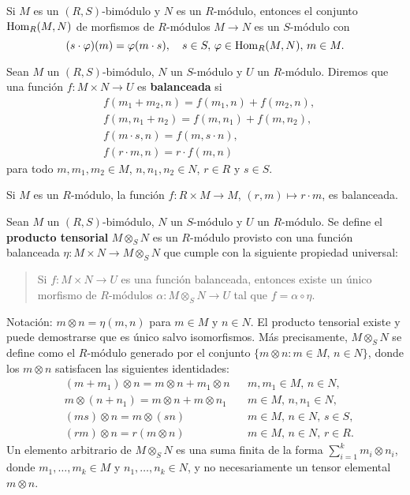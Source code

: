 \begin{example}
Si $M$ es un $(R,S)$-bimódulo y $N$ es un $R$-módulo, entonces el conjunto 
$\operatorname{Hom}_R(M,N)$ de morfismos de $R$-módulos $M\to N$ es un 
$S$-módulo con 
\[
(s\cdot \varphi)(m)=\varphi(m\cdot s),\quad s\in S,\,\varphi\in\operatorname{Hom}_R(M,N),\,m\in M.
\]
\end{example}

Sean $M$ un $(R,S)$-bimódulo, $N$ un $S$-módulo y $U$ un $R$-módulo. 
Diremos que una función $f\colon M\times N\to U$ 
es \textbf{balanceada} si 
\begin{align*}
    &f(m_1+m_2,n)=f(m_1,n)+f(m_2,n),\\
    &f(m,n_1+n_2)=f(m,n_1)+f(m,n_2),\\
    &f(m\cdot s,n)=f(m,s\cdot n),\\
    &f(r\cdot m,n)=r\cdot f(m,n)
\end{align*}
para todo $m,m_1,m_2\in M$, $n,n_1,n_2\in N$, $r\in R$ y $s\in S$. 

\begin{example}
Si $M$ es un $R$-módulo, la función $f\colon R\times M\to M$, $(r,m)\mapsto r\cdot m$, es balanceada. 
\end{example}

Sean $M$ un $(R,S)$-bimódulo, $N$ un $S$-módulo y $U$ un $R$-módulo. 
Se define el \textbf{producto tensorial} $M\otimes_S N$ es un $R$-módulo provisto con una función balanceada 
$\eta\colon M\times N\to M\otimes_S N$ que cumple con la siguiente propiedad universal: 
\begin{quote}
Si $f\colon M\times N\to U$ es una función balanceada, entonces
existe un único morfismo de $R$-módulos $\alpha\colon M\otimes_S N\to U$ tal que $f=\alpha\circ\eta$. 
\end{quote}
Notación: $m\otimes n=\eta(m,n)$ para $m\in M$ y $n\in N$.
El producto tensorial existe y puede demostrarse que es único salvo isomorfismos. Más precisamente, $M\otimes_S N$
se define como el $R$-módulo generado por
el conjunto $\{m\otimes n:m\in M,\,n\in N\}$, donde los $m\otimes n$ satisfacen 
las siguientes identidades:
\begin{align}
    &(m+m_1)\otimes n=m\otimes n+m_1\otimes n &&\text{$m,m_1\in M$, $n\in N$},\\
    &m\otimes(n+n_1)=m\otimes n+m\otimes n_1 &&\text{$m\in M$, $n,n_1\in N$},\\
    &(ms)\otimes n=m\otimes (sn) &&\text{$m\in M$, $n\in N$, $s\in S$},\\
    &(rm)\otimes n=r(m\otimes n) &&\text{$m\in M$, $n\in N$, $r\in R$}.
\end{align}
Un elemento arbitrario de $M\otimes_S N$ es una suma finita
de la forma 
$\sum_{i=1}^k m_i\otimes n_i$,
donde $m_1,\dots,m_k\in M$ y $n_1,\dots,n_k\in N$, y no necesariamente un tensor elemental $m\otimes n$. 

